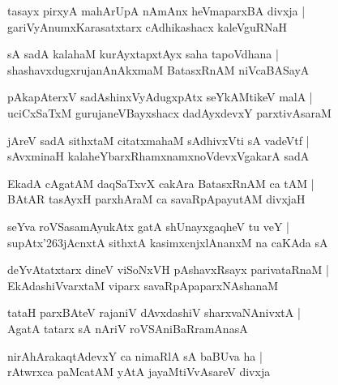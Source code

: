 \begin{shloka}
tasayx pirxyA mahArUpA nAmAnx heVmaparxBA divxja |\\
gariVyAnumxKarasatxtarx cAdhikashacx kaleVguRNaH
\end{shloka}

\begin{shloka}
sA sadA kalahaM kurAyxtapxtAyx saha tapoVdhana |\\
shashavxdugxrujanAnAkxmaM BatasxRnAM niVcaBASayA
\end{shloka}

\begin{shloka}
pAkapAterxV sadAshinxVyAdugxpAtx seYkAMtikeV malA |\\
uciCxSaTxM gurujaneVBayxshacx dadAyxdevxY parxtivAsaraM
\end{shloka}

\begin{shloka}
jAreV sadA sithxtaM citatxmahaM sAdhivxVti sA vadeVtf |\\
sAvxminaH kalaheYbarxRhamxnamxnoVdevxVgakarA sadA
\end{shloka}

\begin{shloka}
EkadA cAgatAM daqSaTxvX cakAra BatasxRnAM ca tAM |\\
BAtAR tasAyxH parxhAraM ca savaRpApayutAM divxjaH
\end{shloka}

\begin{shloka}
seYva roVSasamAyukAtx gatA shUnayxgaqheV tu veY |\\
supAtx\char'263jAcnxtA sithxtA kasimxcnjxlAnanxM na caKAda sA
\end{shloka}

\begin{shloka}
deYvAtatxtarx dineV viSoNxVH pAshavxRsayx parivataRnaM |\\
EkAdashiVvarxtaM viparx savaRpApaparxNAshanaM
\end{shloka}

\begin{shloka}
tataH parxBAteV rajaniV dAvxdashiV sharxvaNAnivxtA |\\
AgatA tatarx sA nAriV roVSAniBaRramAnasA
\end{shloka}

\begin{shloka}
nirAhArakaqtAdevxY ca nimaRlA sA baBUva ha |\\
rAtwrxca paMcatAM yAtA jayaMtiVvAsareV divxja
\end{shloka}

